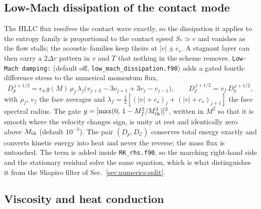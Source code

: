 \subsection{Low-Mach dissipation of the contact mode}
\label{sec:hydro:lowmach}

The HLLC flux resolves the contact wave exactly, so the dissipation it
applies to the entropy family is proportional to the contact speed $S_*
\simeq v$ and vanishes as the flow stalls; the acoustic families keep theirs
at $|v|\pm c_s$.  A stagnant layer can then carry a $2\Delta r$ pattern in
$v$ and $T$ that nothing in the scheme removes.  \texttt{Low-Mach damping:}
(default off, \texttt{low\_mach\_dissipation.f90}) adds a gated
fourth-difference stress \citep{Jameson1981} to the numerical momentum flux,
%
\begin{equation}
  D_p^{\,j+1/2} = \epsilon_4\,g(M)\,\rho_f\,\lambda_f
    \bigl(v_{j+2} - 3v_{j+1} + 3v_j - v_{j-1}\bigr),
  \qquad
  D_{\mathcal{E}}^{\,j+1/2} = v_f\,D_p^{\,j+1/2},
  \label{eq:lowmach}
\end{equation}
%
with $\rho_f$, $v_f$ the face averages and
$\lambda_f = \tfrac12[(|v|+c_s)_j + (|v|+c_s)_{j+1}]$ the face spectral
radius.  The gate
$g = [\max(0,\,1 - M_f^2/M_{\rm th}^2)]^2$, written in $M^2$ so that it is
smooth where the velocity changes sign, is unity at rest and identically zero
above $M_{\rm th}$ (default $10^{-3}$).  The pair $(D_p, D_{\mathcal{E}})$ conserves total
energy exactly and converts kinetic energy into heat and never the reverse;
the mass flux is untouched.  The term is added inside \texttt{RK\_rhs.f90}, so
the marching right-hand side and the stationary residual solve the same
equation, which is what distinguishes it from the Shapiro filter of
Sec.~\ref{sec:numerics:split}.

\subsection{Viscosity and heat conduction}
\label{sec:hydro:transport}

